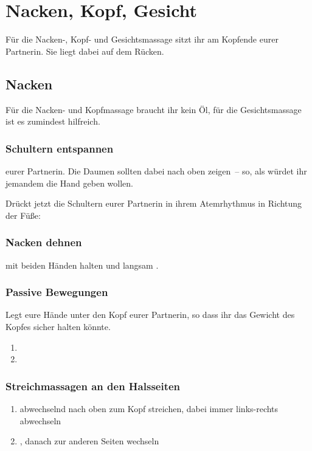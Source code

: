 \section{Nacken, Kopf, Gesicht}

Für die Nacken-, Kopf- und Gesichtsmassage sitzt ihr am Kopfende eurer Partnerin. Sie liegt dabei auf dem Rücken.

\subsection{Nacken}

Für die Nacken- und Kopfmassage braucht ihr kein Öl, für die Gesichtsmassage ist es zumindest hilfreich.

\subsubsection{Schultern entspannen}
 eurer Partnerin. Die Daumen sollten dabei nach oben zeigen~-- so, als würdet ihr jemandem die Hand geben wollen.

Drückt jetzt die Schultern eurer Partnerin in ihrem Atemrhythmus in Richtung der Füße: 

\subsubsection{Nacken dehnen}
 mit beiden Händen halten und langsam .

\subsubsection{Passive Bewegungen}

Legt eure Hände unter den Kopf eurer Partnerin, so dass ihr das Gewicht des Kopfes sicher halten könnte.

\begin{enumerate}
	\item {}
	\item {}
\end{enumerate}


\subsubsection{Streichmassagen an den Halsseiten}

\begin{enumerate}
	\item {} abwechselnd nach oben zum Kopf streichen, dabei immer links-rechts abwechseln
	\item {}, danach zur anderen Seiten wechseln
\end{enumerate}


